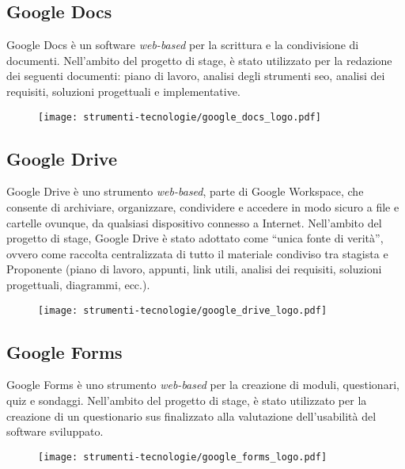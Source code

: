 \subsection*{Google Docs}

\par Google Docs è un software \textit{web-based} per la scrittura e la condivisione di documenti. Nell’ambito del progetto di stage, è stato utilizzato per la redazione dei seguenti documenti: piano di lavoro, analisi degli strumenti \gls{seo}, analisi dei requisiti, soluzioni progettuali e implementative.

\begin{figure}[H]
    \centering 
    \texttt{[image: strumenti-tecnologie/google\_docs\_logo.pdf]} 
\end{figure}

\subsection*{Google Drive}

\par Google Drive è uno strumento \textit{web-based}, parte di Google Workspace, che consente di archiviare, organizzare, condividere e accedere in modo sicuro a file e cartelle ovunque, da qualsiasi dispositivo connesso a Internet. Nell’ambito del progetto di stage, Google Drive è stato adottato come “unica fonte di verità”, ovvero come raccolta centralizzata di tutto il materiale condiviso tra stagista e Proponente (piano di lavoro, appunti, link utili, analisi dei requisiti, soluzioni progettuali, diagrammi, ecc.).

\begin{figure}[H]
    \centering 
    \texttt{[image: strumenti-tecnologie/google\_drive\_logo.pdf]} 
\end{figure}

\subsection*{Google Forms}

\par Google Forms è uno strumento \textit{web-based} per la creazione di moduli, questionari, quiz e sondaggi. Nell’ambito del progetto di stage, è stato utilizzato per la creazione di un questionario \gls{sus} finalizzato alla valutazione dell’usabilità del software sviluppato.

\begin{figure}[H]
    \centering 
    \texttt{[image: strumenti-tecnologie/google\_forms\_logo.pdf]} 
\end{figure}

